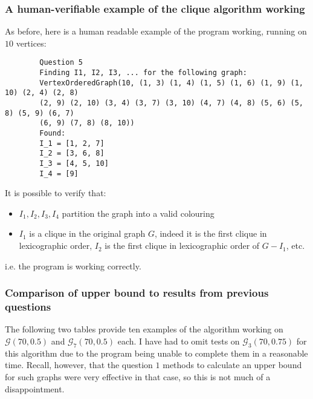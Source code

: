 \documentclass{article}
\begin{document}
\subsubsection{A human-verifiable example of the clique algorithm working}

As before, here is a human readable example of the program working, running on $10$ vertices:

\begin{tcolorbox}[size=small]
	\begin{verbatim}
		Question 5
		Finding I1, I2, I3, ... for the following graph:
		VertexOrderedGraph(10, (1, 3) (1, 4) (1, 5) (1, 6) (1, 9) (1, 10) (2, 4) (2, 8)
		(2, 9) (2, 10) (3, 4) (3, 7) (3, 10) (4, 7) (4, 8) (5, 6) (5, 8) (5, 9) (6, 7)
		(6, 9) (7, 8) (8, 10))
		Found:
		I_1 = [1, 2, 7]
		I_2 = [3, 6, 8]
		I_3 = [4, 5, 10]
		I_4 = [9]
	\end{verbatim}
\end{tcolorbox}

It is possible to verify that:

\begin{itemize}
	\item $I_1, I_2, I_3, I_4$ partition the graph into a valid colouring
	\item $I_1$ is a clique in the original graph $G$, indeed it is the first clique in lexicographic order, $I_2$ is the first clique in lexicographic order of $G-I_1$, etc.
 \end{itemize}
 
 i.e. the program is working correctly.
 
 \subsubsection{Comparison of upper bound to results from previous questions}
 
 The following two tables provide ten examples of the algorithm working on $\mathcal{G}(70, 0.5)$ and $\mathcal{G}_7(70, 0.5)$ each. I have had to omit tests on $\mathcal{G}_3(70, 0.75)$ for this algorithm due to the program being unable to complete them in a reasonable time. Recall, however, that the question $1$ methods to calculate an upper bound for such graphs were very effective in that case, so this is not much of a disappointment.
 
 \begin{center}
 \end{center}
 
\end{document}
